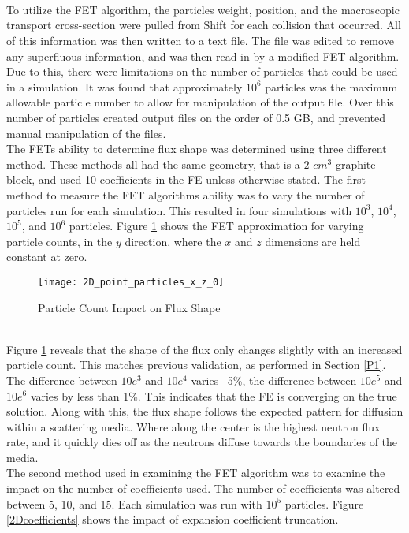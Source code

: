 \documentclass[10tma4paper]{article}
\begin{document}
\\
\\
\\
To utilize the FET algorithm, the particles weight, position, and the macroscopic transport cross-section were pulled from Shift for each collision that occurred. All of this information was then written to a text file. The file was edited to remove any superfluous information, and was then read in by a modified FET algorithm. Due to this, there were limitations on the number of particles that could be used in a simulation. It was found that approximately $10^6$ particles was the maximum allowable particle number to allow for manipulation of the output file. Over this number of particles created output files on the order of 0.5 GB, and prevented manual manipulation of the files.
\\
The FETs ability to determine flux shape was determined using three different method. These methods all had the same geometry, that is a $2$ $cm^3$ graphite block, and used 10 coefficients in the FE unless otherwise stated. The first method to measure the FET algorithms ability was to vary the number of particles run for each simulation. This resulted in four simulations with $10^3$, $10^4$, $10^5$, and $10^6$ particles. Figure \ref{2DFluxparticle} shows the FET approximation for varying particle counts, in the $y$ direction, where the $x$ and $z$ dimensions are held constant at zero.
\begin{figure}[!htbp]
	\caption{Particle Count Impact on Flux Shape}
	\begin{center}
		\texttt{[image: 2D\_point\_particles\_x\_z\_0]}
	\end{center}
	\label{2DFluxparticle}
\end{figure}
\\
Figure \ref{2DFluxparticle} reveals that the shape of the flux only changes slightly with an increased particle count. This matches previous validation, as performed in Section \ref{P1}. The difference between $10e^3$ and $10e^4$ varies ~5\%, the difference between $10e^5$ and $10e^6$ varies by less than 1\%. This indicates that the FE is converging on the true solution. Along with this, the flux shape follows the expected pattern for diffusion within a scattering media. Where along the center is the highest neutron flux rate, and it quickly dies off as the neutrons diffuse towards the boundaries of the media.
\\
The second method used in examining the FET algorithm was to examine the impact on the number of coefficients used. The number of coefficients was altered between 5, 10, and 15. Each simulation was run with $10^5$ particles. Figure \ref{2Dcoefficients} shows the impact of expansion coefficient truncation.
\end{document}
